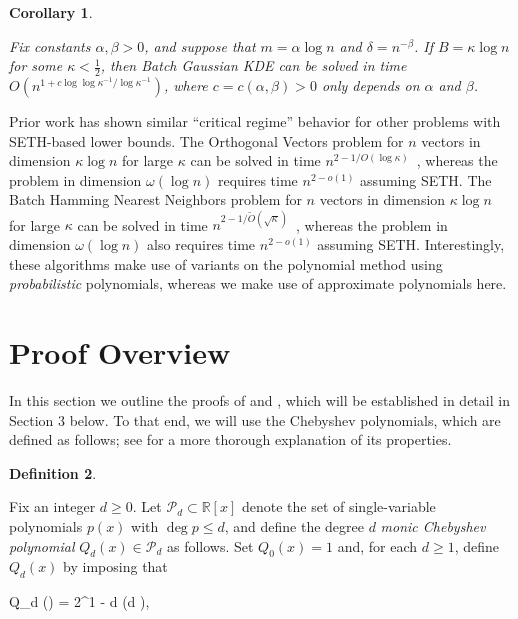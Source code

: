 \documentclass[10pt,a4paper]{article}
\theoremstyle{plain}\newtheorem{theorem}{Theorem}
\newtheorem{corollary}[theorem]{Corollary}
\theoremstyle{definition}
\newtheorem{definition}[theorem]{Definition}
\begin{document}
\begin{corollary}

\label{fkappa} 

Fix constants $\alpha, \beta > 0$, and suppose that $m = \alpha \log n$ and $\delta = n^{-\beta}$. If $B = \kappa \log n$ for some $\kappa < \frac{1}{2}$, then Batch Gaussian KDE can be solved in time $O(n^{1 + c \log \log \kappa^{-1} / \log \kappa^{-1}})$, where $c = c(\alpha, \beta) > 0$ only depends on $\alpha$ and $\beta$.

\end{corollary}


Prior work has shown similar ``critical regime'' behavior for other problems with SETH-based lower bounds. The Orthogonal Vectors problem for $n$ vectors in dimension $\kappa \log n$ for large $\kappa$ can be solved in time $n^{2 - 1/O(\log \kappa)}$~\cite{abboud2014more,chan2016deterministic}, whereas the problem in dimension $\omega(\log n)$ requires time $n^{2 - o(1)}$ assuming SETH. The Batch Hamming Nearest Neighbors problem for $n$ vectors in dimension $\kappa \log n$ for large $\kappa$ can be solved in time $n^{2 - 1/\tilde{O}(\sqrt{\kappa})}$~\cite{alman2015probabilistic,alman2016polynomial}, whereas the problem in dimension $\omega(\log n)$ also requires time $n^{2 - o(1)}$ assuming SETH. Interestingly, these algorithms make use of variants on the polynomial method using \emph{probabilistic} polynomials, whereas we make use of approximate polynomials here.

\section{Proof Overview}

In this section we outline the proofs of  and , which will be established in detail in Section 3 below. To that end, we will use the Chebyshev polynomials, which are defined as follows; see  for a more thorough explanation of its properties.

	\begin{definition}
		
		\label{pd1} 
		
		Fix an integer $d \ge 0$. Let $\mathcal{P}_d \subset \mathbb{R} [x]$ denote the set of single-variable polynomials $p(x)$ with $\deg p \le d$, and define the degree $d$ \emph{monic Chebyshev polynomial} $Q_d (x) \in \mathcal{P}_d$ as follows. Set $Q_0 (x) = 1$ and, for each $d \ge 1$, define $Q_d (x)$ by imposing that
	\begin{flalign}
	\label{qdtheta}
	Q_d (\cos \theta) = 2^{1 - d} \cos (d \theta), \qquad {}
	\end{flalign}
		
	\end{definition}
	
\end{document}
